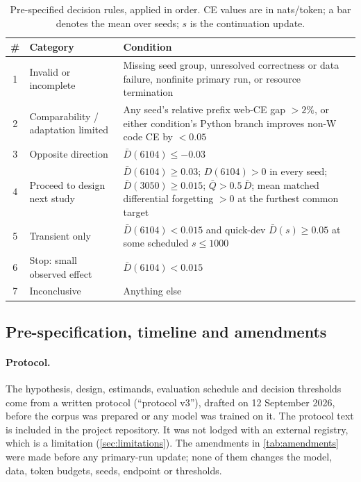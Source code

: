 \documentclass[11pt]{article}
\begin{document}
\begin{table}[t]
\centering
\small
\caption{Pre-specified decision rules, applied in order. CE values are in nats/token; a bar denotes the mean over
seeds; $s$ is the continuation update.}
\label{tab:rules}
\begin{tabular}{@{}clp{8.6cm}@{}}
\toprule
\# & Category & Condition \\
\midrule
1 & Invalid or incomplete & Missing seed group, unresolved correctness or data failure, nonfinite primary run, or resource termination \\
2 & Comparability / adaptation limited & Any seed's relative prefix web-CE gap $> 2\%$, or either condition's Python branch improves non-W code CE by $< 0.05$ \\
3 & Opposite direction & $\bar D(6104) \le -0.03$ \\
4 & Proceed to design next study & $\bar D(6104) \ge 0.03$; $D(6104) > 0$ in every seed; $\bar D(3050) \ge 0.015$; $\bar Q > 0.5\,\bar D$; mean matched differential forgetting $> 0$ at the furthest common target \\
5 & Transient only & $\bar D(6104) < 0.015$ and quick-dev $\bar D(s) \ge 0.05$ at some scheduled $s \le 1000$ \\
6 & Stop: small observed effect & $\bar D(6104) < 0.015$ \\
7 & Inconclusive & Anything else \\
\bottomrule
\end{tabular}
\end{table}

\subsection{Pre-specification, timeline and amendments}
\label{sec:prespec}

\paragraph{Protocol.} The hypothesis, design, estimands, evaluation schedule and decision thresholds come from a
written protocol (``protocol v3''), drafted on 12 September 2026, before the corpus was prepared or any model was
trained on it. The protocol text is included in the project repository. It was not lodged with an external
registry, which is a limitation (\cref{sec:limitations}). The amendments in \cref{tab:amendments} were made before
any primary-run update; none of them changes the model, data, token budgets, seeds, endpoint or thresholds.
\end{document}
